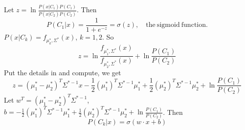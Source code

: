 \documentclass{article}
\begin{document}
            Let $z=\ln \frac{P(x|C_1)P(C_1)}{P(x|C_2)P(C_2)}$. Then
            \[
                P(C_1|x)=\frac{1}{1+e^{-z}}=\sigma(z),\quad\mathrm{the~sigmoid~function}.
            \]
            $P(x|C_k)=f_{\mu_k^*,\Sigma^*}(x)$, $k=1,2$. So
            \[
                z=\ln\frac{f_{\mu_1^*,\Sigma^*}(x)}{f_{\mu_2^*,\Sigma^*}(x)}+\ln\frac{P(C_1)}{P(C_2)}
            \]
            Put the details in and compute, we get
            \[
                z = (\mu_1^*-\mu_2^*)^T\Sigma^{*-1}x-\frac{1}{2}(\mu_1^*)^T\Sigma^{*-1}\mu_1^*+\frac{1}{2}(\mu_2^*)^T\Sigma^{*-1}\mu_2^*+\ln\frac{P(C_1)}{P(C_2)}
            \]
            Let $w^T=(\mu_1^*-\mu_2^*)^T\Sigma^{*-1}$, $b=-\frac{1}{2}(\mu_1^*)^T\Sigma^{*-1}\mu_1^*+\frac{1}{2}(\mu_2^*)^T\Sigma^{*-1}\mu_2^*+\ln\frac{P(C_1)}{P(C_2)}$. Then
            \[
                P(C_k|x)=\sigma(w \cdot x+b)
            \]
\end{document}
